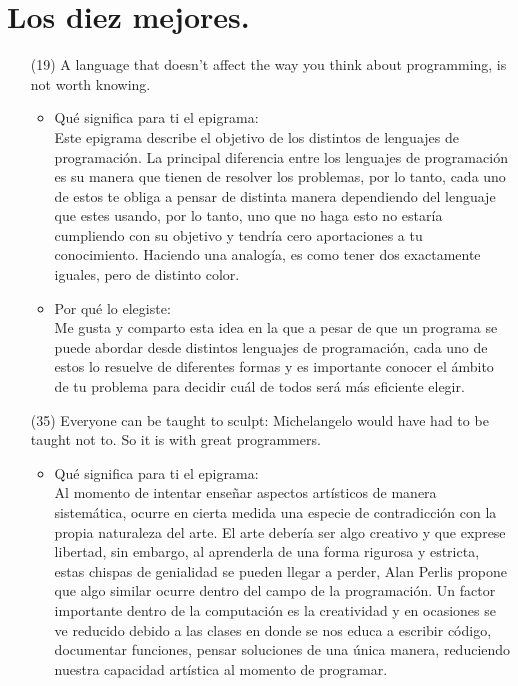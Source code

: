 \documentclass{article}
\begin{document}
\section{Los diez mejores.}
\begin{itemize}
    \item[(19)]A language that doesn’t affect the way you think about programming, is not worth knowing.
    \begin{itemize}
        \item Qué significa para ti el epigrama:\\
        Este epigrama describe el objetivo de los distintos de lenguajes de programación. La principal diferencia entre los lenguajes de programación es su manera que tienen de resolver los problemas, por lo tanto, cada uno de estos te obliga a pensar de distinta manera dependiendo del lenguaje que estes usando, por lo tanto, uno que no haga esto no estaría cumpliendo con su objetivo y tendría cero aportaciones a tu conocimiento. Haciendo una analogía, es como tener dos exactamente iguales, pero de distinto color.
        \item Por qué lo elegiste:\\
        Me gusta y comparto esta idea en la que a pesar de que un programa se puede abordar desde distintos lenguajes de programación, cada uno de estos lo resuelve de diferentes formas y es importante conocer el ámbito de tu problema para decidir cuál de todos será más eficiente elegir.
    \end{itemize}
    \item[(35)]Everyone can be taught to sculpt: Michelangelo would have had to be taught not to. So it is with great programmers.
    \begin{itemize}
        \item Qué significa para ti el epigrama:\\
        Al momento de intentar enseñar aspectos artísticos de manera sistemática, ocurre en cierta medida una especie de contradicción con la propia naturaleza del arte. El arte debería ser algo creativo y que exprese libertad, sin embargo, al aprenderla de una forma rigurosa y estricta, estas chispas de genialidad se pueden llegar a perder, Alan Perlis propone que algo similar ocurre dentro del campo de la programación. Un factor importante dentro de la computación es la creatividad y en ocasiones se ve reducido debido a las clases en donde se nos educa a escribir código, documentar funciones, pensar soluciones de una única manera, reduciendo nuestra capacidad artística al momento de programar.

\end{itemize}
\end{itemize}
\end{document}

